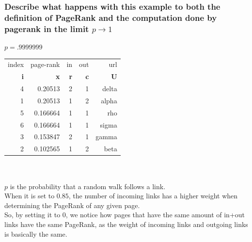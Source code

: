 \documentclass[unicode,11pt,a4paper,oneside,numbers=endperiod,openany]{scrartcl}
\begin{document}
\subsubsection{Describe what happens with this example to both the deﬁnition of PageRank and the computation done by pagerank in the limit $p \rightarrow 1$}
$p = .9999999$\\
\begin{tabular}{|r|r|r|r|r|}
\hline
index & page-rank & in & out & url \\
{\color{teal}\textbf{i}} & \textbf{{\color{teal}x}} & \textbf{{\color{teal}r}} & \textbf{{\color{teal}c}} & \textbf{{\color{teal}U}} \\
\hline
 4  &    0.20513  &   2  &    1  &  delta \\
 1  &    0.20513  &   1  &    2  &  alpha \\
 5  &   0.166664  &   1  &    1  &    rho \\
 6  &   0.166664  &   1  &    1  &  sigma \\
 3  &   0.153847  &   2  &    1  &  gamma \\
 2  &   0.102565  &   1  &    2  &   beta \\
\hline
\end{tabular}\\
\\
$p$ is the probability that a random walk follows a link.\\
When it is set to $0.85$, the number of incoming links has a higher weight when determining the PageRank of any given page.\\
So, by setting it to $0$, we notice how pages that have the same amount of in+out links have the same PageRank, as the weight of incoming links and outgoing links is basically the same.\\


\end{document}
